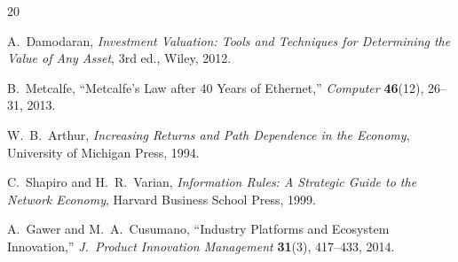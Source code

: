 \documentclass[11pt,a4paper]{article}
\theoremstyle{remark}
\begin{document}
\begin{thebibliography}{20}

A.~Damodaran,
\emph{Investment Valuation: Tools and Techniques for Determining
the Value of Any Asset},
3rd ed., Wiley, 2012.

B.~Metcalfe,
``Metcalfe's Law after 40 Years of Ethernet,''
\emph{Computer} \textbf{46}(12), 26--31, 2013.

W.~B.~Arthur,
\emph{Increasing Returns and Path Dependence in the Economy},
University of Michigan Press, 1994.

C.~Shapiro and H.~R.~Varian,
\emph{Information Rules: A Strategic Guide to the Network Economy},
Harvard Business School Press, 1999.

A.~Gawer and M.~A.~Cusumano,
``Industry Platforms and Ecosystem Innovation,''
\emph{J.\ Product Innovation Management} \textbf{31}(3), 417--433, 2014.

\end{thebibliography}
\end{document}
